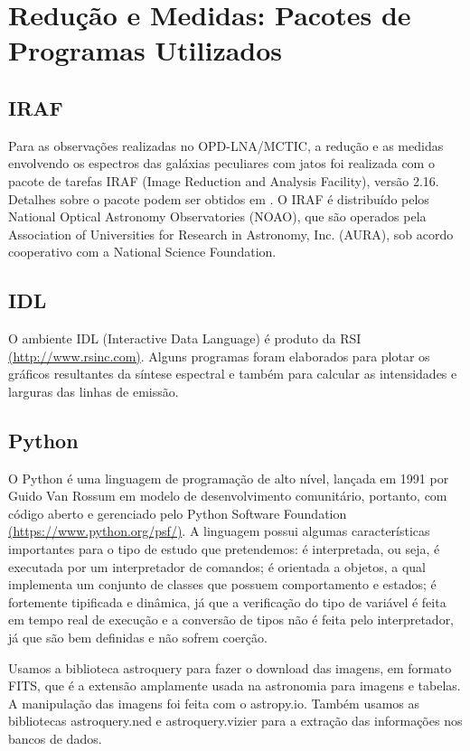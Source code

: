 \chapter{Redução e Medidas: Pacotes de Programas Utilizados}

\section{IRAF}

Para as observações realizadas no OPD-LNA/MCTIC, a redução e as medidas envolvendo os espectros das galáxias peculiares com jatos foi realizada com o pacote de tarefas IRAF (Image Reduction and Analysis Facility), versão 2.16. Detalhes sobre o pacote podem ser obtidos em . O IRAF é distribuído pelos National Optical Astronomy Observatories (NOAO), que são operados pela Association of Universities for Research in Astronomy, Inc. (AURA), sob acordo cooperativo com a National Science Foundation.

\section{IDL}

O ambiente IDL (Interactive Data Language) é produto da RSI \url{(http://www.rsinc.com)}. Alguns programas foram elaborados para plotar os gráficos resultantes da síntese espectral e também para calcular as intensidades e larguras das linhas de emissão.

\section{Python}

O Python é uma linguagem de programação de alto nível, lançada em 1991 por Guido Van Rossum em modelo de desenvolvimento comunitário, portanto, com código aberto e gerenciado pelo Python Software Foundation \url{(https://www.python.org/psf/)}. A linguagem possui algumas características importantes para o tipo de estudo que pretendemos: é interpretada, ou seja, é
executada por um interpretador de comandos; é orientada a objetos, a qual implementa um conjunto de classes que possuem comportamento e estados; é fortemente tipificada e dinâmica, já que a verificação do tipo de variável é feita em tempo real de execução e a conversão de tipos não é feita pelo interpretador, já que são bem definidas e não sofrem coerção.

Usamos a biblioteca astroquery para fazer o download das imagens,
em formato FITS, que é a extensão amplamente usada na astronomia para imagens e tabelas. A manipulação das imagens foi feita com o astropy.io. Também usamos as bibliotecas astroquery.ned e astroquery.vizier para a extração das informações nos bancos de dados.

